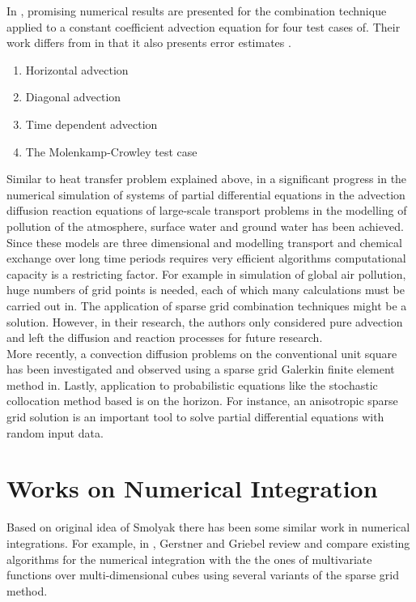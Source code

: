 In \cite{Griebel1999}, promising numerical results are presented for the combination technique applied to a constant coefficient advection equation for four test cases of. Their work differs from \cite{Griebel1999} in that it also presents error estimates \cite{Lastdrager2000}.
\begin{enumerate}
\item Horizontal advection
\item Diagonal advection 
\item Time dependent advection
\item The Molenkamp-Crowley test case
\end{enumerate}
Similar to heat transfer problem explained above, in \cite{Lastdrager2001} a significant progress in the numerical simulation of systems of partial differential equations in the advection diffusion reaction equations of large-scale transport problems in the modelling of pollution of the atmosphere, surface water and ground water has been achieved. Since these models are three dimensional and modelling transport and chemical exchange over long time periods requires very efficient algorithms computational capacity is a restricting factor. For example in simulation of global air pollution, huge numbers of grid points is needed, each of which many calculations must be carried out in. The application of sparse grid combination techniques might be a solution. However, in their research, the authors only considered pure advection and left the diffusion and reaction processes for future research\cite{Lastdrager2001}.\\

More recently, a convection diffusion problems on the conventional unit square has been investigated and observed using a sparse grid Galerkin finite element method in\cite{Franz2009}. Lastly, application to probabilistic equations like the stochastic collocation method based is on the horizon. For instance, an anisotropic sparse grid solution is an important tool to solve partial differential equations with random input data\cite{Erhel2015}.
\section{Works on Numerical Integration} 
Based on original idea of Smolyak there has been some similar work in numerical integrations. For example, in \cite{Gerstner1998}, Gerstner and Griebel review and compare existing algorithms for the numerical integration with the the ones of multivariate functions over multi-dimensional cubes using several variants of the sparse grid method.\cite{Gerstner1998, smolyak63quadrature}

